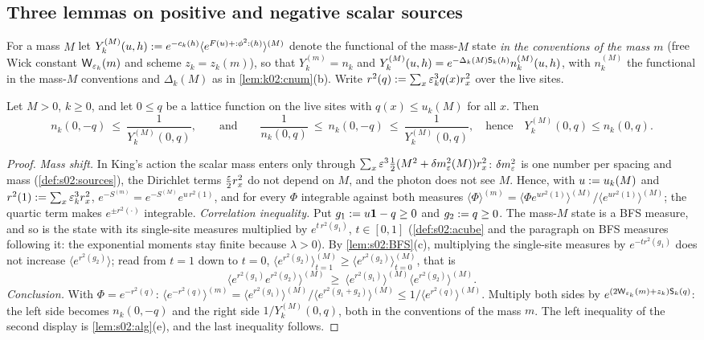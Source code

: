 \subsection{Three lemmas on positive and negative scalar sources}\label{ssec:k02:lemmas}

For a mass $M$ let $Y^{(M)}_k(u,h):= e^{-c_k(h)}\langle e^{F(u)+{:}\phi^2{:}(h)}\rangle^{(M)}$ denote the functional of the mass-$M$ state \emph{in the conventions of the mass $m$} (free Wick constant $\mathsf W_{\varepsilon_k}(m)$ and scheme $z_k=z_k(m)$), so that $Y^{(m)}_k=n_k$ and $Y^{(M)}_k(u,h)=e^{-\Delta_k(M)\mathsf S_k(h)}n^{(M)}_k(u,h)$, with $n^{(M)}_k$ the functional in the mass-$M$ conventions and $\Delta_k(M)$ as in \cref{lem:k02:cnum}(b). Write $r^2(q):=\sum_{x}\varepsilon_k^3q(x)r_x^2$ over the live sites.

\begin{lemma}\label{lem:k02:GM}
Let $M>0$, $k\ge0$, and let $0\le q$ be a lattice function on the live sites with $q(x)\le u_k(M)$ for all $x$. Then
\[
n_k(0,-q)\ \le\ \frac1{Y^{(M)}_k(0,q)},\qquad\text{and}\qquad \frac1{n_k(0,q)}\ \le\ n_k(0,-q)\ \le\ \frac1{Y^{(M)}_k(0,q)},\quad\text{hence}\quad Y^{(M)}_k(0,q)\le n_k(0,q).
\]
\end{lemma}
\begin{proof}
\emph{Mass shift.} In King's action the scalar mass enters only through $\sum_x\varepsilon^3\frac12(M^2+\delta m^2_{\varepsilon}(M))r_x^2$: $\delta m^2_{\varepsilon}$ is one number per spacing and mass (\cref{def:s02:sources}), the Dirichlet terms $\frac{\varepsilon}2r_x^2$ do not depend on $M$, and the photon does not see $M$. Hence, with $u:= u_k(M)$ and $r^2(1):=\sum_x\varepsilon_k^3r_x^2$, $e^{-S^{(m)}}=e^{-S^{(M)}}e^{u\,r^2(1)}$, and for every $\Phi$ integrable against both measures $\langle\Phi\rangle^{(m)}=\langle\Phi e^{ur^2(1)}\rangle^{(M)}/\langle e^{ur^2(1)}\rangle^{(M)}$; the quartic term makes $e^{\pm r^2(\cdot)}$ integrable. \emph{Correlation inequality.} Put $g_1:= u\mathbf 1-q\ge0$ and $g_2:= q\ge0$. The mass-$M$ state is a BFS measure, and so is the state with its single-site measures multiplied by $e^{t\,r^2(g_1)}$, $t\in[0,1]$ (\cref{def:s02:acube} and the paragraph on BFS measures following it: the exponential moments stay finite because $\lambda>0$). By \cref{lem:s02:BFS}(c), multiplying the single-site measures by $e^{-tr^2(g_1)}$ does not increase $\langle e^{r^2(g_2)}\rangle$; read from $t=1$ down to $t=0$, $\langle e^{r^2(g_2)}\rangle^{(M)}_{t=1}\ge\langle e^{r^2(g_2)}\rangle^{(M)}_{t=0}$, that is
\[
\langle e^{r^2(g_1)}e^{r^2(g_2)}\rangle^{(M)}\ \ge\ \langle e^{r^2(g_1)}\rangle^{(M)}\langle e^{r^2(g_2)}\rangle^{(M)}.
\]
\emph{Conclusion.} With $\Phi=e^{-r^2(q)}$: $\langle e^{-r^2(q)}\rangle^{(m)}=\langle e^{r^2(g_1)}\rangle^{(M)}/\langle e^{r^2(g_1+g_2)}\rangle^{(M)}\le1/\langle e^{r^2(q)}\rangle^{(M)}$. Multiply both sides by $e^{(2\mathsf W_{\varepsilon_k}(m)+z_k)\mathsf S_k(q)}$: the left side becomes $n_k(0,-q)$ and the right side $1/Y^{(M)}_k(0,q)$, both in the conventions of the mass $m$. The left inequality of the second display is \cref{lem:s02:alg}(e), and the last inequality follows.
\end{proof}

